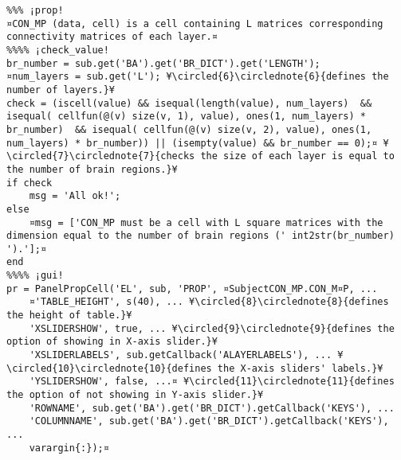 \documentclass{tufte-handout}
\begin{document}
\begin{lstlisting}
%%% ¡prop!
¤CON_MP (data, cell) is a cell containing L matrices corresponding connectivity matrices of each layer.¤
%%%% ¡check_value!
br_number = sub.get('BA').get('BR_DICT').get('LENGTH');
¤num_layers = sub.get('L'); ¥\circled{6}\circlednote{6}{defines the number of layers.}¥
check = (iscell(value) && isequal(length(value), num_layers)  && isequal( cellfun(@(v) size(v, 1), value), ones(1, num_layers) * br_number)  && isequal( cellfun(@(v) size(v, 2), value), ones(1, num_layers) * br_number)) || (isempty(value) && br_number == 0);¤ ¥\circled{7}\circlednote{7}{checks the size of each layer is equal to the number of brain regions.}¥
if check
    msg = 'All ok!';
else   
    ¤msg = ['CON_MP must be a cell with L square matrices with the dimension equal to the number of brain regions (' int2str(br_number) ').'];¤
end
%%%% ¡gui! 
pr = PanelPropCell('EL', sub, 'PROP', ¤SubjectCON_MP.CON_M¤P, ...
    ¤'TABLE_HEIGHT', s(40), ... ¥\circled{8}\circlednote{8}{defines the height of table.}¥
    'XSLIDERSHOW', true, ... ¥\circled{9}\circlednote{9}{defines the option of showing in X-axis slider.}¥
    'XSLIDERLABELS', sub.getCallback('ALAYERLABELS'), ... ¥\circled{10}\circlednote{10}{defines the X-axis sliders' labels.}¥
    'YSLIDERSHOW', false, ...¤ ¥\circled{11}\circlednote{11}{defines the option of not showing in Y-axis slider.}¥
    'ROWNAME', sub.get('BA').get('BR_DICT').getCallback('KEYS'), ...
    'COLUMNNAME', sub.get('BA').get('BR_DICT').getCallback('KEYS'), ...
    varargin{:});¤

\end{lstlisting}
\end{document}
